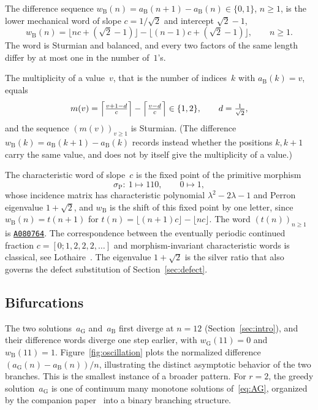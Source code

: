 \documentclass{birkjour}
\theoremstyle{definition}
\theoremstyle{remark}
\newcommand{\fl}[1]{\lfloor #1 \rfloor}
\begin{document}
The difference sequence
$w_{\mathrm{B}}(n)=a_{\mathrm{B}}(n{+}1)-a_{\mathrm{B}}(n)
\in\{0,1\}$, $n\ge 1$, is the lower mechanical word of slope
$c=1/\!\sqrt{2}$ and intercept $\sqrt{2}-1$,
\[
  w_{\mathrm{B}}(n)
  =\fl{nc+(\sqrt{2}-1)}-\fl{(n{-}1)c+(\sqrt{2}-1)},
  \qquad n\ge 1.
\]
The word is Sturmian and balanced, and every two factors of
the same length differ by at most one in the number
of~$1$'s.

The multiplicity of a value~$v$, that is the number of
indices~$k$ with $a_{\mathrm{B}}(k)=v$, equals
\[
  m(v)=\Bigl\lceil\tfrac{v+1-d}{c}\Bigr\rceil
       -\Bigl\lceil\tfrac{v-d}{c}\Bigr\rceil\in\{1,2\},
  \qquad d=\tfrac1{\sqrt2},
\]
and the sequence $(m(v))_{v\ge 1}$ is Sturmian. (The
difference $w_{\mathrm{B}}(k)=a_{\mathrm{B}}(k{+}1)-a_{\mathrm{B}}(k)$
records instead whether the positions $k,k{+}1$ carry the
same value, and does not by itself give the multiplicity of
a value.)

The characteristic word of slope~$c$ is the fixed point of
the primitive morphism
\[
  \sigma_{\mathrm{P}}\colon\ 1\mapsto 110,\qquad 0\mapsto 1,
\]
whose incidence matrix has characteristic polynomial
$\lambda^{2}-2\lambda-1$ and Perron eigenvalue $1+\sqrt{2}$,
and $w_{\mathrm{B}}$ is the shift of this fixed point by one
letter, since $w_{\mathrm{B}}(n)=t(n{+}1)$ for
$t(n)=\fl{(n{+}1)c}-\fl{nc}$. The word $(t(n))_{n\ge 1}$ is
\href{https://oeis.org/A080764}{\texttt{A080764}}.
The correspondence between the
eventually periodic continued fraction
$c=[0;1,2,2,2,\ldots]$ and morphism-invariant characteristic
words is classical, see Lothaire~\cite[Chapter~2]{Lothaire}.
The eigenvalue $1+\sqrt{2}$ is the silver ratio that also
governs the defect substitution of
Section~\ref{sec:defect}.

\subsection{Bifurcations}

The two solutions~$a_{\mathrm{G}}$
and~$a_{\mathrm{B}}$ first diverge at
$n=12$ (Section~\ref{sec:intro}), and their
difference
words diverge one step earlier, with
$w_{\mathrm{G}}(11)=0$ and $w_{\mathrm{B}}(11)=1$.
Figure~\ref{fig:oscillation} plots the normalized difference
$(a_{\mathrm{G}}(n)-a_{\mathrm{B}}(n))/n$, illustrating the
distinct asymptotic behavior of the two branches.
This is the smallest instance of a broader
pattern.  For $r=2$, the greedy solution~$a_{\mathrm{G}}$
is one of continuum many monotone solutions of~\eqref{eq:AG},
organized by the companion paper~\cite{Cloitre_tree} into a
binary branching structure.
\end{document}
